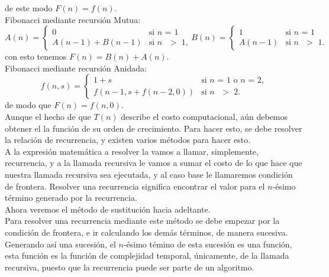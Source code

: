 \documentclass[12pt,twoside]{article}
\begin{document}
de este modo $F(n)=f(n)$.
\newline
\\ Fibonacci mediante recursión Mutua:
\begin{equation}
    A(n)=
    \begin{cases}
        0 &\text{si $n$ = 1} \\
        A(n-1)+B(n-1) &\text{si $n$ $>$ 1,}
    \end{cases}
    B(n)=
    \begin{cases}
        1 &\text{si $n$ = 1} \\
        A(n-1) &\text{si $n$ $>$ 1.}
    \end{cases}
\end{equation}
con esto tenemos $F(n)=B(n)+A(n)$.
\newline
\\ Fibonacci mediante recursión Anidada:
\begin{equation}
    f(n,s)=
    \begin{cases}
        1+s &\text{si $n$ = 1 o $n$ = 2,} \\
        f(n-1,s+f(n-2,0)) &\text{si $n$ $>$ 2.}
    \end{cases}
\end{equation}
de modo que $F(n)=f(n,0)$.
\newline
\\ Aunque el hecho de que $T(n)$ describe el costo computacional, aún debemos obtener el la función de su orden de crecimiento. Para hacer esto, se debe resolver la relación de recurrencia, y existen varios métodos para hacer esto.
\\ A la expresión matemática a resolver la vamos a llamar, simplemente, recurrencia, y a la llamada recursiva le vamos a sumar el costo de lo que hace que nuestra llamada recursiva sea ejecutada, y al caso base le llamaremos condición de frontera. Resolver una recurrencia significa encontrar el valor para el $n$-ésimo término generado por la recurrencia.
\newline
\\ Ahora veremos el método de sustitución hacia adeltante.
\\ Para resolver una recurrencia mediante este método se debe empezar por la condición de frontera, e ir calculando los demás términos, de manera sucesiva. Generando así una sucesión, el $n$-ésimo témino de esta sucesión es una función, esta función es la función de complejidad temporal, únicamente, de la llamada recursiva, puesto que la recurrencia puede ser parte de un algoritmo.
\newline
\end{document}
